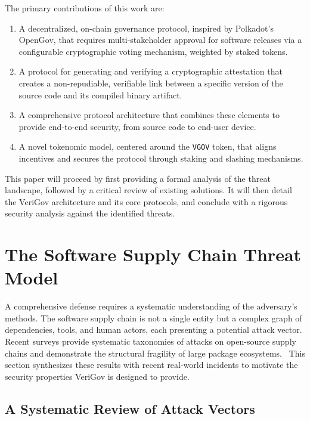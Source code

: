 \documentclass{article}
\begin{document}
The primary contributions of this work are:

\begin{enumerate}
\item A decentralized, on-chain governance protocol, inspired by Polkadot's OpenGov, that requires multi-stakeholder approval for software releases via a configurable cryptographic voting mechanism, weighted by staked tokens.
\item A protocol for generating and verifying a cryptographic attestation that creates a non-repudiable, verifiable link between a specific version of the source code and its compiled binary artifact.
\item A comprehensive protocol architecture that combines these elements to provide end-to-end security, from source code to end-user device.
\item A novel tokenomic model, centered around the \lstinline{VGOV} token, that aligns incentives and secures the protocol through staking and slashing mechanisms.
\end{enumerate}

This paper will proceed by first providing a formal analysis of the threat landscape, followed by a critical review of existing solutions. It will then detail the VeriGov architecture and its core protocols, and conclude with a rigorous security analysis against the identified threats.

\section{The Software Supply Chain Threat Model}
\label{sec:the-software-supply-chain-threat-model}

A comprehensive defense requires a systematic understanding of the adversary's methods. The software supply chain is not a single entity but a complex graph of dependencies, tools, and human actors, each presenting a potential attack vector. Recent surveys provide systematic taxonomies of attacks on open-source supply chains and demonstrate the structural fragility of large package ecosystems.~\cite{ladisa2023sok,ohm2020backstabber,zimmermann2019small,duan2021measuring} This section synthesizes these results with recent real-world incidents to motivate the security properties VeriGov is designed to provide.

\subsection{A Systematic Review of Attack Vectors}
\end{document}
